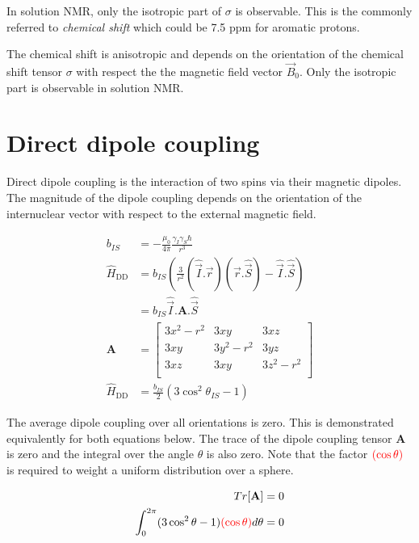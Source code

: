 \documentclass[11pt]{article}
\theoremstyle{definition}
\begin{document}
In solution NMR, only the isotropic part of $\sigma$ is observable. This is the commonly referred to \emph{chemical shift} which could be 7.5 ppm for aromatic protons.

\begin{shaded}
	The chemical shift is anisotropic and depends on the orientation of the chemical shift tensor $\sigma$ with respect the the magnetic field vector $\vec B_0$. Only the isotropic part is observable in solution NMR.
\end{shaded}

\section{Direct dipole coupling}
Direct dipole coupling is the interaction of two spins via their magnetic dipoles. The magnitude of the dipole coupling depends on the orientation of the internuclear vector with respect to the external magnetic field. 

\begin{align}
	b_{IS} &=-\frac{\mu_0}{4\pi}\frac{\gamma_I \gamma_S \hbar}{r^3} \\
	\hat H_\text{DD}&=b_{IS}
	\left
		(\frac{3}{r^2} (\hat{\vec I}.\vec r)(\vec r.\hat{\vec S}) - \hat{\vec I}.\hat{\vec S}
	\right)\\
	&=b_{IS}\hat{\vec I}.\mathbf{A}.\hat{\vec S}\\
	\mathbf{A}&=
	\begin{bmatrix}
		3x^2-r^2 & 3xy & 3xz\\
		3xy & 3y^2-r^2 & 3yz\\
		3xz & 3xy & 3z^2-r^2\\
	\end{bmatrix}\\
	\hat H_\text{DD}&=\frac{b_{IS}}{2}\left(3\cos^2{\theta_{IS}-1} \right)
\end{align}

The average dipole coupling over all orientations is zero. This is demonstrated equivalently for both equations below. The trace of the dipole coupling tensor $\mathbf{A}$ is zero and the integral over the angle $\theta$ is also zero. Note that the factor ${\color{red}(\cos{\theta})}$ is required to weight a uniform distribution over a sphere.

\begin{align}
	Tr[\mathbf{A}] &= 0\\
	\int_0^{2\pi}(3\cos^2{\theta}-1){\color{red}(\cos{\theta})}d\theta &= 0
\end{align}
\end{document}
